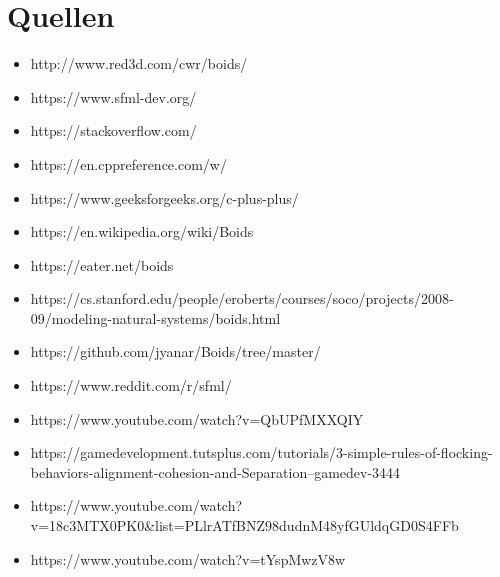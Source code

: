 \documentclass{article}
\begin{document}
    \section{Quellen}
        \begin{itemize}
            \item http://www.red3d.com/cwr/boids/
            \item https://www.sfml-dev.org/
            \item https://stackoverflow.com/
            \item https://en.cppreference.com/w/
            \item https://www.geeksforgeeks.org/c-plus-plus/
            \item https://en.wikipedia.org/wiki/Boids
            \item https://eater.net/boids
            \item https://cs.stanford.edu/people/eroberts/courses/soco/projects/2008-09/modeling-natural-systems/boids.html
            \item https://github.com/jyanar/Boids/tree/master/
            \item https://www.reddit.com/r/sfml/
            \item https://www.youtube.com/watch?v=QbUPfMXXQIY
            \item https://gamedevelopment.tutsplus.com/tutorials/3-simple-rules-of-flocking-behaviors-alignment-cohesion-and-Separation--gamedev-3444
            \item https://www.youtube.com/watch?v=18c3MTX0PK0\newline\&list=PLlrATfBNZ98dudnM48yfGUldqGD0S4FFb
            \item https://www.youtube.com/watch?v=tYspMwzV8w
        \end{itemize}
        

    
    
\end{document}
